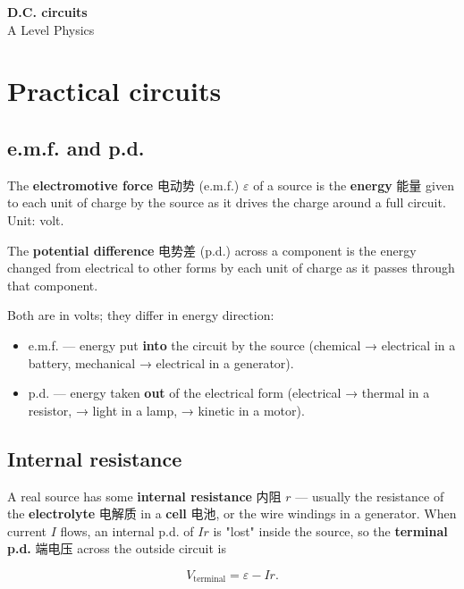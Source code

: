 \documentclass[11pt]{article}
\begin{document}
\begin{center}
  {\LARGE\bfseries D.C. circuits}\\[0.35em]
  {\large A Level Physics}
\end{center}
\vspace{0.6em}

\section*{Practical circuits}

\subsection*{e.m.f. and p.d.}

The \textbf{electromotive force} 电动势 (e.m.f.) $\varepsilon$ of a source is the \textbf{energy} 能量 given to each unit of charge by the source as it drives the charge around a full circuit. Unit: volt.

The \textbf{potential difference} 电势差 (p.d.) across a component is the energy changed from electrical to other forms by each unit of charge as it passes through that component.

Both are in volts; they differ in energy direction:

\begin{itemize}
\item e.m.f. — energy put \textbf{into} the circuit by the source (chemical → electrical in a battery, mechanical → electrical in a generator).

\item p.d. — energy taken \textbf{out} of the electrical form (electrical → thermal in a resistor, → light in a lamp, → kinetic in a motor).

\end{itemize}

\subsection*{Internal resistance}

A real source has some \textbf{internal resistance} 内阻 $r$ — usually the resistance of the \textbf{electrolyte} 电解质 in a \textbf{cell} 电池, or the wire windings in a generator. When current $I$ flows, an internal p.d. of $Ir$ is "lost" inside the source, so the \textbf{terminal p.d.} 端电压 across the outside circuit is

\[
V_{\text{terminal}} = \varepsilon - I r.
\]
\end{document}

